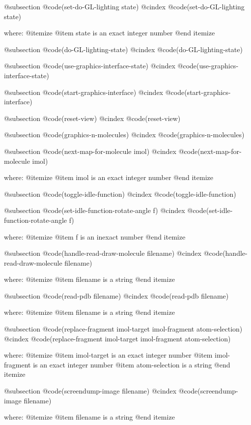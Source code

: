 @subsection @code{(set-do-GL-lighting state)}
@cindex @code{(set-do-GL-lighting state)}
 
where: 
 @itemize 
     @item state is an exact integer number
 @end itemize


@subsection @code{(do-GL-lighting-state)}
@cindex @code{(do-GL-lighting-state)}
 
@subsection @code{(use-graphics-interface-state)}
@cindex @code{(use-graphics-interface-state)}
 
@subsection @code{(start-graphics-interface)}
@cindex @code{(start-graphics-interface)}
 
@subsection @code{(reset-view)}
@cindex @code{(reset-view)}
 
@subsection @code{(graphics-n-molecules)}
@cindex @code{(graphics-n-molecules)}
 
@subsection @code{(next-map-for-molecule imol)}
@cindex @code{(next-map-for-molecule imol)}
 
where: 
 @itemize 
     @item imol is an exact integer number
 @end itemize


@subsection @code{(toggle-idle-function)}
@cindex @code{(toggle-idle-function)}
 
@subsection @code{(set-idle-function-rotate-angle f)}
@cindex @code{(set-idle-function-rotate-angle f)}
 
where: 
 @itemize 
     @item f is an inexact number
 @end itemize


@subsection @code{(handle-read-draw-molecule filename)}
@cindex @code{(handle-read-draw-molecule filename)}
 
where: 
 @itemize 
     @item filename is a string
 @end itemize


@subsection @code{(read-pdb filename)}
@cindex @code{(read-pdb filename)}
 
where: 
 @itemize 
     @item filename is a string
 @end itemize


@subsection @code{(replace-fragment imol-target imol-fragment atom-selection)}
@cindex @code{(replace-fragment imol-target imol-fragment atom-selection)}
 
where: 
 @itemize 
     @item imol-target is an exact integer number
     @item imol-fragment is an exact integer number
     @item atom-selection is a string
 @end itemize


@subsection @code{(screendump-image filename)}
@cindex @code{(screendump-image filename)}
 
where: 
 @itemize 
     @item filename is a string
 @end itemize



